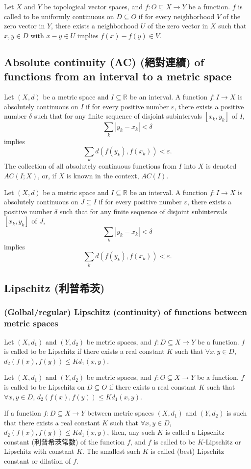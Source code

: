 \documentclass[a4paper,12pt]{report}
\begin{document}
\begin{itemize}
\begin{itemize}
Let $X$ and $Y$ be topological vector spaces, and $f\colon O\subseteq X\to Y$ be a function. $f$ is called to be uniformly continuous on $D\subseteq O$ if for every neighborhood $V$ of the zero vector in $Y$, there exists a neighborhood $U$ of the zero vector in $X$ such that $x,y\in D$ with $x-y\in U$ implies $f(x)-f(y)\in V$.
\subsection{Absolute continuity (AC) (絕對連續) of functions from an interval to a metric space}
Let $(X, d)$ be a metric space and $I\subseteq\mathbb{R}$ be an interval. A function $f\colon I \to X$ is absolutely continuous on $I$ if for every positive number $\varepsilon$, there exists a positive number $\delta$ such that for any finite sequence of disjoint subintervals $[x_k, y_k]$ of $I$,
\[\sum _{k}\left|y_{k}-x_{k}\right|<\delta\]
implies
\[\sum _{k}d\left(f(y_{k}),f(x_{k})\right)<\varepsilon.\]
The collection of all absolutely continuous functions from $I$ into $X$ is denoted $AC(I; X)$, or, if $X$ is known in the context, $AC(I)$.

Let $(X, d)$ be a metric space and $I\subseteq\mathbb{R}$ be an interval. A function $f\colon I \to X$ is absolutely continuous on $J\subseteq I$ if for every positive number $\varepsilon$, there exists a positive number $\delta$ such that for any finite sequence of disjoint subintervals $[x_k, y_k]$ of $J$,
\[\sum _{k}\left|y_{k}-x_{k}\right|<\delta\]
implies
\[\sum _{k}d\left(f(y_{k}),f(x_{k})\right)<\varepsilon.\]
\subsection{Lipschitz (利普希茨)}
\subsubsection{(Golbal/regular) Lipschitz (continuity) of functions between metric spaces}
Let $(X,d_1)$ and $(Y,d_2)$ be metric spaces, and $f\colon D\subseteq X\to Y$ be a function. $f$ is called to be Lipschitz if there exists a real constant $K$ such that $\forall x,y\in D$, $d_{2}(f(x),f(y))\leq Kd_{1}(x,y)$.

Let $(X,d_1)$ and $(Y,d_2)$ be metric spaces, and $f\colon O\subseteq X\to Y$ be a function. $f$ is called to be Lipschitz on $D\subseteq O$ if there exists a real constant $K$ such that $\forall x,y\in D$, $d_{2}(f(x),f(y))\leq Kd_{1}(x,y)$.

If a function $f\colon D\subseteq X\to Y$ between metric spaces $(X,d_1)$ and $(Y,d_2)$ is such that there exists a real constant $K$ such that $\forall x,y\in D$, $d_{2}(f(x),f(y))\leq Kd_{1}(x,y)$, then, any such $K$ is called a Lipschitz constant (利普希茨常數) of the function $f$, and $f$ is called to be $K$-Lipschitz or Lipschitz with constant $K$. The smallest such $K$ is called (best) Lipschitz constant or dilation of $f$.

\end{itemize}
\end{itemize}
\end{document}
